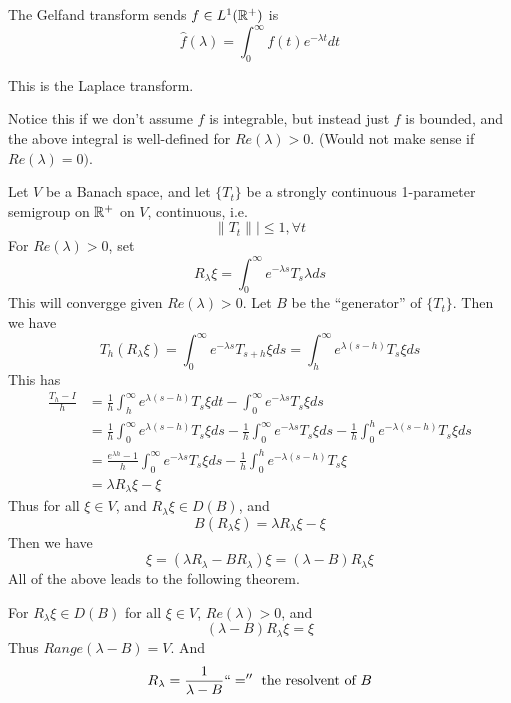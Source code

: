 The Gelfand transform sends $f\in L^1(\mathbb{R}^+)$ is 
\begin{equation*}
    \widehat{f}(\lambda)=\int_0^\infty f(t)e^{-\lambda t}dt
\end{equation*}
\begin{note}
    This is the Laplace transform.
\end{note}
\begin{note}
    Notice this if we don't assume $f$ is integrable, but instead just $f$ is bounded, and the above integral is well-defined for $Re(\lambda)>0$. (Would not make sense if $Re(\lambda)=0)$.
\end{note}
Let $V$ be a Banach space, and let $\{T_t\}$ be a strongly continuous 1-parameter semigroup on $\mathbb{R}^+$ on $V$, continuous, i.e.
\begin{equation*}
    \|T_t\||\leq 1, \forall t
\end{equation*}
For $Re(\lambda)>0$, set 
\begin{equation*}
    R_\lambda\xi=\int_0^\infty e^{-\lambda s}T_s\lambda ds
\end{equation*}
This will convergge given $Re(\lambda)>0$. Let $B$ be the ``generator'' of $\{T_t\}$. Then we have
\begin{equation*}
    T_h(R_\lambda\xi)=\int_0^\infty e^{-\lambda s}T_{s+h}\xi ds=\int_h^\infty e^{\lambda(s-h)}T_s\xi ds 
\end{equation*}
This has 
\begin{align*}
    \frac{T_h-I}{h}&=\frac{1}{h}\int_h^\infty e^{\lambda(s-h)}T_s\xi dt-\int_0^\infty e^{-\lambda s}T_s\xi ds\\
    &=\frac{1}{h}\int_0^\infty e^{\lambda(s-h)}T_s\xi ds-\frac{1}{h}\int_0^\infty e^{-\lambda s}T_s\xi ds-\frac{1}{h}\int_0^h e^{-\lambda(s-h)}T_s\xi ds\\
    &=\frac{e^{\lambda h}-1}{h}\int_0^\infty e^{-\lambda s}T_s\xi ds-\frac{1}{h}\int_0^h e^{-\lambda(s-h)}T_s\xi\\
    &=\lambda R_\lambda\xi-\xi
\end{align*}
Thus for all $\xi\in V$, and $R_\lambda\xi\in D(B)$, and 
\begin{equation*}
    B(R_\lambda\xi)=\lambda R_\lambda\xi-\xi
\end{equation*}
Then we have
\begin{equation*}
    \xi=(\lambda R_\lambda-BR_\lambda)\xi=(\lambda-B)R_\lambda\xi
\end{equation*}
All of the above leads to the following theorem.
\begin{theorem}
    For $R_\lambda\xi\in D(B)$ for all $\xi\in V$, $Re(\lambda)>0$, and 
    \begin{equation*}
        (\lambda-B)R_\lambda\xi=\xi
    \end{equation*}
    Thus $Range(\lambda-B)=V$. And 
    \begin{equation*}
        R_\lambda=\frac{1}{\lambda-B} ``='' \text{ the resolvent of } B
    \end{equation*}
\end{theorem}

